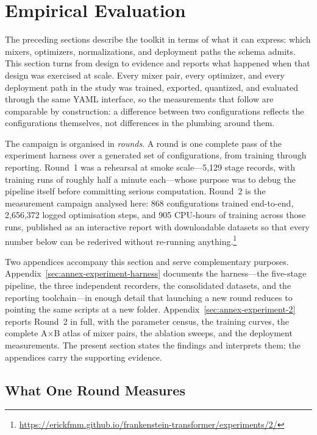 \section{Empirical Evaluation}
\label{sec:empirical-evaluation}

The preceding sections describe the toolkit in terms of what it can express: which mixers, optimizers, normalizations, and deployment paths the schema admits. This section turns from design to evidence and reports what happened when that design was exercised at scale. Every mixer pair, every optimizer, and every deployment path in the study was trained, exported, quantized, and evaluated through the same YAML interface, so the measurements that follow are comparable by construction: a difference between two configurations reflects the configurations themselves, not differences in the plumbing around them.

The campaign is organised in \emph{rounds}. A round is one complete pass of the experiment harness over a generated set of configurations, from training through reporting. Round~1 was a rehearsal at smoke scale---5{,}129 stage records, with training runs of roughly half a minute each---whose purpose was to debug the pipeline itself before committing serious computation. Round~2 is the measurement campaign analysed here: 868 configurations trained end-to-end, 2{,}656{,}372 logged optimisation steps, and 905 CPU-hours of training across those runs, published as an interactive report with downloadable datasets so that every number below can be rederived without re-running anything.\footnote{\url{https://erickfmm.github.io/frankenstein-transformer/experiments/2/}}

Two appendices accompany this section and serve complementary purposes. Appendix~\ref{sec:annex-experiment-harness} documents the harness---the five-stage pipeline, the three independent recorders, the consolidated datasets, and the reporting toolchain---in enough detail that launching a new round reduces to pointing the same scripts at a new folder. Appendix~\ref{sec:annex-experiment-2} reports Round~2 in full, with the parameter census, the training curves, the complete A$\times$B atlas of mixer pairs, the ablation sweeps, and the deployment measurements. The present section states the findings and interprets them; the appendices carry the supporting evidence.

\subsection{What One Round Measures}

